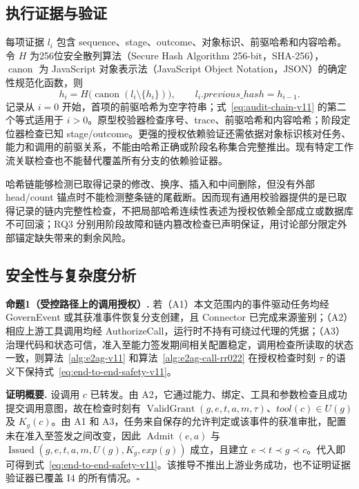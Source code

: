 \subsection{执行证据与验证}

每项证据 $l_i$ 包含 sequence、stage、outcome、对象标识、前驱哈希和内容哈希。令 $H$ 为256位安全散列算法（Secure Hash Algorithm 256-bit，SHA-256），$\operatorname{canon}$ 为 JavaScript 对象表示法（JavaScript Object Notation，JSON）的确定性规范化函数，则
\begin{equation}
h_i=H\bigl(\operatorname{canon}(l_i\setminus\{h_i\})\bigr),\qquad
l_i.previous\_hash=h_{i-1}.
\label{eq:audit-chain-v11}
\end{equation}
记录从 $i=0$ 开始，首项的前驱哈希为空字符串；式~\eqref{eq:audit-chain-v11} 的第二个等式适用于 $i>0$。原型校验器检查序号、trace、前驱哈希和内容哈希；阶段定位器检查已知 stage/outcome。更强的授权依赖验证还需依据对象标识核对任务、能力和调用的前驱关系，不能由哈希正确或阶段名称集合完整推出。现有特定工作流关联检查也不能替代覆盖所有分支的依赖验证器。

哈希链能够检测已取得记录的修改、换序、插入和中间删除，但没有外部 head/count 锚点时不能检测整条链的尾截断。因而现有通用校验器提供的是已取得记录的链内完整性检查，不把局部哈希连续性表述为授权依赖全部成立或数据库不可回滚；RQ3 分别用阶段故障和链内篡改检查已声明保证，用讨论部分限定外部锚定缺失带来的剩余风险。

\subsection{安全性与复杂度分析}

\noindent\textbf{命题1（受控路径上的调用授权）.}
若（A1）本文范围内的事件驱动任务均经 GovernEvent 或其获准事件恢复分支创建，且 Connector 已完成来源鉴别；（A2）相应上游工具调用均经 AuthorizeCall，运行时不持有可绕过代理的凭据；（A3）治理代码和状态可信，准入至能力签发期间相关配置稳定，调用检查所读取的状态一致，则算法~\ref{alg:e2ag-v11} 和算法~\ref{alg:e2ag-call-rr022} 在授权检查时刻 $\tau$ 的语义下保持式~\eqref{eq:end-to-end-safety-v11}。

\noindent\textbf{证明概要.}
设调用 $c$ 已转发。由 A2，它通过能力、绑定、工具和参数检查且成功提交调用意图，故在检查时刻有 $\operatorname{ValidGrant}(g,e,t,a,m,\tau)$、$tool(c)\in U(g)$ 及 $K_g(c)$。由 A1 和 A3，任务来自保存的允许判定或该事件的获准审批，配置未在准入至签发之间改变，因此 $\operatorname{Admit}(e,a)$ 与 $\operatorname{Issued}(g,e,t,a,m,U(g),K_g,exp(g))$ 成立，且建立 $e\prec t\prec g\prec c$。代入即可得到式~\eqref{eq:end-to-end-safety-v11}。该推导不推出上游业务成功，也不证明证据验证器已覆盖 I4 的所有情况。\hfill$\square$

